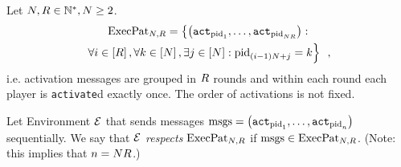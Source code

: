 \begin{definition}
  \label{model:def:execpat}
  Let $N, R \in \mathbb{N}^*, N \geq 2$.
  \begin{gather*}
    \mathrm{ExecPat}_{N, R} = \left\{\left(\mathtt{act}_{\mathrm{pid}_1}, \dots,
    \mathtt{act}_{\mathrm{pid}_{N R}}\right) :\right. \\
    \left.\forall i \in \left[R\right], \forall k \in
    \left[N\right], \exists j \in \left[N\right]: \mathrm{pid}_{(i -
    1) N + j} = k\right\} \enspace,
  \end{gather*}
  i.e. activation messages are grouped in $R$ rounds and within each round
  each player is \texttt{activate}d exactly once. The order of activations is
  not fixed.

  Let Environment $\mathcal{E}$ that sends messages $\mathrm{msgs} =
  \left(\mathtt{act}_{\mathrm{pid}_1}, \dots, \mathtt{act}_{\mathrm{pid}_n}\right)$
  sequentially. We say that \emph{$\mathcal{E}$ respects $\mathrm{ExecPat}_{N,
  R}$} if $\mathrm{msgs} \in \mathrm{ExecPat}_{N, R}$. (Note: this
  implies that $n = N R$.)
\end{definition}
